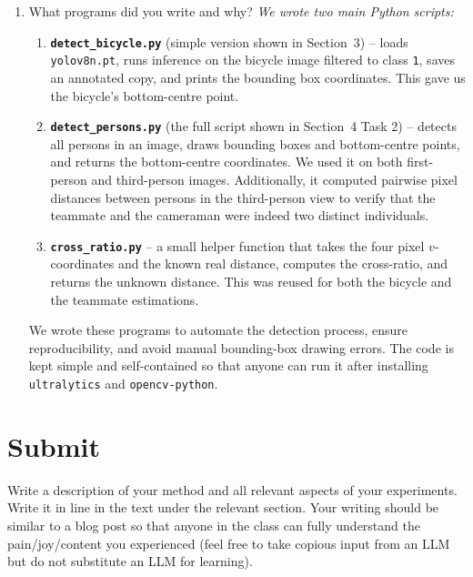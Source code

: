 \documentclass[11pt]{article}
\newenvironment{studentSpace}{\itshape}{}
\begin{document}
\begin{enumerate}
\item What programs did you write and why?  
\begin{studentSpace}
We wrote two main Python scripts:

\begin{enumerate}
\item \textbf{\texttt{detect\_bicycle.py}} (simple version shown in
  Section~3) -- loads \texttt{yolov8n.pt}, runs inference on the
  bicycle image filtered to class \texttt{1}, saves an annotated copy,
  and prints the bounding box coordinates. This gave us the bicycle's
  bottom-centre point.

\item \textbf{\texttt{detect\_persons.py}} (the full script shown in
  Section~4 Task 2) -- detects all persons in an image, draws bounding
  boxes and bottom-centre points, and returns the bottom-centre
  coordinates. We used it on both first-person and third-person images.
  Additionally, it computed pairwise pixel distances between persons in
  the third-person view to verify that the teammate and the cameraman
  were indeed two distinct individuals.

\item \textbf{\texttt{cross\_ratio.py}} -- a small helper function that
  takes the four pixel $v$-coordinates and the known real distance,
  computes the cross-ratio, and returns the unknown distance. This was
  reused for both the bicycle and the teammate estimations.
\end{enumerate}

We wrote these programs to automate the detection process, ensure
reproducibility, and avoid manual bounding-box drawing errors. The
code is kept simple and self-contained so that anyone can run it after
installing \texttt{ultralytics} and \texttt{opencv-python}.
\end{studentSpace}


\end{enumerate}

\section{Submit}

Write a description of your method and all relevant aspects of your
experiments. Write it in line in the text under the relevant section.  Your writing should be similar to  a blog post so that anyone in the class can fully understand the pain/joy/content you experienced (feel free to take copious input from an LLM but do not substitute an LLM for learning).
\end{document}
